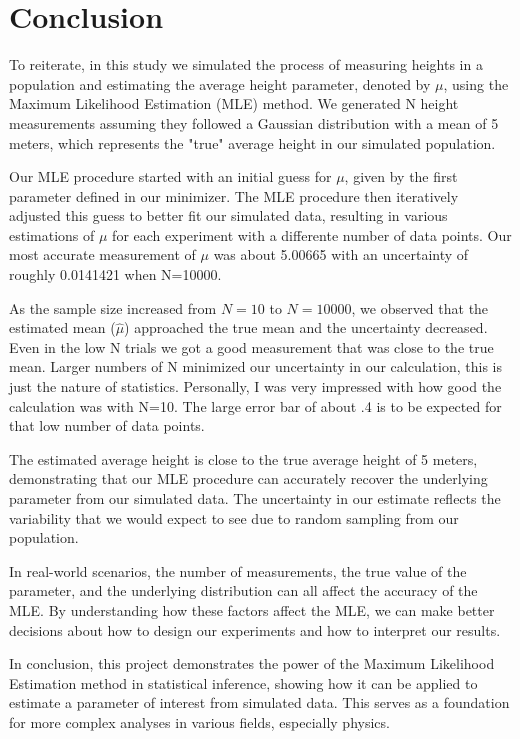 \documentclass[12pt]{article}
\begin{document}
\section*{Conclusion}
To reiterate, in this study we simulated the process of measuring heights in a population and estimating the average height parameter, denoted by $\mu$, using the Maximum Likelihood Estimation (MLE) method. We generated N height measurements assuming they followed a Gaussian distribution with a mean of 5 meters, which represents the "true" average height in our simulated population. 

Our MLE procedure started with an initial guess for $\mu$, given by the first parameter defined in our minimizer. The MLE procedure then iteratively adjusted this guess to better fit our simulated data, resulting in various estimations of $\mu$ for each experiment with a differente number of data points. Our most accurate measurement of $\mu$ was about 5.00665 with an uncertainty of roughly 0.0141421 when N=10000.

As the sample size increased from $N=10$ to $N=10000$, we observed that the estimated mean ($\hat{\mu}$) approached the true mean and the uncertainty decreased. Even in the low N trials we got a good measurement that was close to the true mean. Larger numbers of N minimized our uncertainty in our calculation, this is just the nature of statistics. Personally, I was very impressed with how good the calculation was with N=10. The large error bar of about .4 is to be expected for that low number of data points.

The estimated average height is close to the true average height of 5 meters, demonstrating that our MLE procedure can accurately recover the underlying parameter from our simulated data. The uncertainty in our estimate reflects the variability that we would expect to see due to random sampling from our population.

In real-world scenarios, the number of measurements, the true value of the parameter, and the underlying distribution can all affect the accuracy of the MLE. By understanding how these factors affect the MLE, we can make better decisions about how to design our experiments and how to interpret our results.

In conclusion, this project demonstrates the power of the Maximum Likelihood Estimation method in statistical inference, showing how it can be applied to estimate a parameter of interest from simulated data. This serves as a foundation for more complex analyses in various fields, especially physics.
\end{document}
